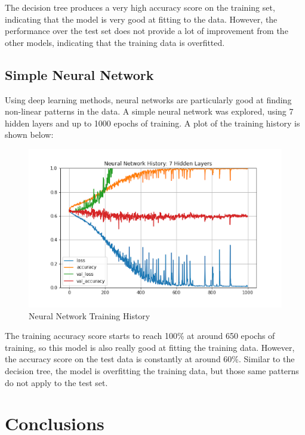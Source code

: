 \documentclass{article}
\begin{document}
The decision tree produces a very high accuracy score on the training set, indicating that the model is very good at fitting to the data. However, the performance over the test set does not provide a lot of improvement from the other models, indicating that the training data is overfitted. 

\subsection{Simple Neural Network}
\label{ssec:subhead}

Using deep learning methods, neural networks are particularly good at finding non-linear patterns in the data. A simple neural network was explored, using 7 hidden layers and up to 1000 epochs of training. A plot of the training history is shown below:\\

\begin{figure}[htb]
\begin{minipage}[b]{1.0\linewidth}
  \centering
  \centerline{\includegraphics[scale=0.4]{Neural_Network_History.png}}
\end{minipage}
\caption{Neural Network Training History}
\label{fig:res}
\end{figure}

The training accuracy score starts to reach 100\% at around 650 epochs of training, so this model is also really good at fitting the training data. However, the accuracy score on the test data is constantly at around 60\%. Similar to the decision tree, the model is overfitting the training data, but those same patterns do not apply to the test set.

\section{Conclusions}
\label{sec:pagestyle}
\end{document}
